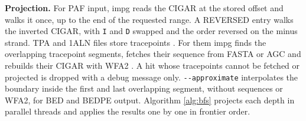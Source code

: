 \textbf{Projection.}
For PAF input, impg reads the CIGAR at the stored offset and walks it once, up to the end of the requested range.
A REVERSED entry walks the inverted CIGAR, with \texttt{I} and \texttt{D} swapped and the order reversed on the minus strand.
TPA \citep{Guarracino2026tpa} and 1ALN \citep{Myers2025fastga,Durbin2024onecode} files store tracepoints \citep{Kaushan2026tracepoints}.
For them impg finds the overlapping tracepoint segments, fetches their sequence from FASTA or AGC \citep{Deorowicz2023agc} and rebuilds their CIGAR with WFA2 \citep{MarcoSola2021wfa}.
A hit whose tracepoints cannot be fetched or projected is dropped with a debug message only.
\texttt{-{}-approximate} interpolates the boundary inside the first and last overlapping segment, without sequences or WFA2, for BED and BEDPE output.
Algorithm \ref{alg:bfs} projects each depth in parallel threads and applies the results one by one in frontier order.

